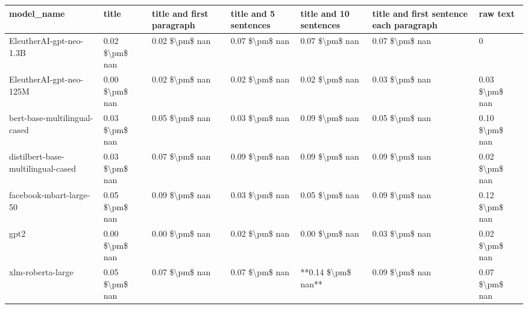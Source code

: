 \begin{tabular}{lllllll}
\toprule
                        model\_name &          title & title and first paragraph & title and 5 sentences & title and 10 sentences & title and first sentence each paragraph &       raw text \\
\midrule
           EleutherAI-gpt-neo-1.3B & 0.02 \$\textbackslash pm\$ nan &            0.02 \$\textbackslash pm\$ nan &        0.07 \$\textbackslash pm\$ nan &         0.07 \$\textbackslash pm\$ nan &                          0.07 \$\textbackslash pm\$ nan &              0 \\
           EleutherAI-gpt-neo-125M & 0.00 \$\textbackslash pm\$ nan &            0.02 \$\textbackslash pm\$ nan &        0.02 \$\textbackslash pm\$ nan &         0.02 \$\textbackslash pm\$ nan &                          0.03 \$\textbackslash pm\$ nan & 0.03 \$\textbackslash pm\$ nan \\
      bert-base-multilingual-cased & 0.03 \$\textbackslash pm\$ nan &            0.05 \$\textbackslash pm\$ nan &        0.03 \$\textbackslash pm\$ nan &         0.09 \$\textbackslash pm\$ nan &                          0.05 \$\textbackslash pm\$ nan & 0.10 \$\textbackslash pm\$ nan \\
distilbert-base-multilingual-cased & 0.03 \$\textbackslash pm\$ nan &            0.07 \$\textbackslash pm\$ nan &        0.09 \$\textbackslash pm\$ nan &         0.09 \$\textbackslash pm\$ nan &                          0.09 \$\textbackslash pm\$ nan & 0.02 \$\textbackslash pm\$ nan \\
           facebook-mbart-large-50 & 0.05 \$\textbackslash pm\$ nan &            0.09 \$\textbackslash pm\$ nan &        0.03 \$\textbackslash pm\$ nan &         0.05 \$\textbackslash pm\$ nan &                          0.09 \$\textbackslash pm\$ nan & 0.12 \$\textbackslash pm\$ nan \\
                              gpt2 & 0.00 \$\textbackslash pm\$ nan &            0.00 \$\textbackslash pm\$ nan &        0.02 \$\textbackslash pm\$ nan &         0.00 \$\textbackslash pm\$ nan &                          0.03 \$\textbackslash pm\$ nan & 0.02 \$\textbackslash pm\$ nan \\
                 xlm-roberta-large & 0.05 \$\textbackslash pm\$ nan &            0.07 \$\textbackslash pm\$ nan &        0.07 \$\textbackslash pm\$ nan &     **0.14 \$\textbackslash pm\$ nan** &                          0.09 \$\textbackslash pm\$ nan & 0.07 \$\textbackslash pm\$ nan \\
\bottomrule
\end{tabular}
